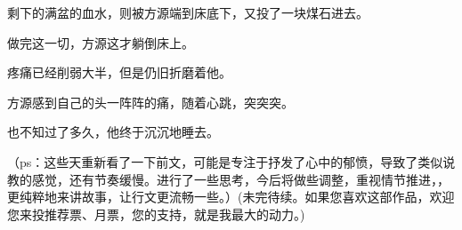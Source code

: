 \begin{this_body}
剩下的满盆的血水，则被方源端到床底下，又投了一块煤石进去。

做完这一切，方源这才躺倒床上。

疼痛已经削弱大半，但是仍旧折磨着他。

方源感到自己的头一阵阵的痛，随着心跳，突突突。

也不知过了多久，他终于沉沉地睡去。

（ps：这些天重新看了一下前文，可能是专注于抒发了心中的郁愤，导致了类似说教的感觉，还有节奏缓慢。进行了一些思考，今后将做些调整，重视情节推进，，更纯粹地来讲故事，让行文更流畅一些。）(未完待续。如果您喜欢这部作品，欢迎您来投推荐票、月票，您的支持，就是我最大的动力。)

\end{this_body}

